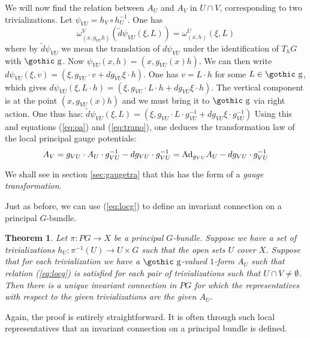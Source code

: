 \documentclass[12pt,titlepage]{article}
\def\goth#1{\hbox{\gothic #1}}
\def\gg{{\goth g}}
\def\Ad{\hbox{Ad}}
\newtheorem{theorem}{Theorem}
\begin{document}
We will now find the relation between \(A _U\) and
\(A _V\) in \(U \cap V\), corresponding to two trivializations.
Let \(\psi_{VU} = h_V\circ h_U^{-1}\). One has
\begin{equation}\label{eq:trano}
\omega^V_{(x,g_{VU}h)}(\tilde d\psi_{VU}(\xi,L)) =
\omega^U_{(x,h)}(\xi,L)
\end{equation}%
where  by \(\tilde d\psi_{VU}\) we mean the
translation of  \(d\psi_{VU}\)
under the
identification of \(T_hG\) with \(\gg\).
Now \(\psi_{VU}(x,h) = (x, g_{VU}(x)h)\).
We can then write
\(d\psi_{VU}(\xi,v) = (\xi, g_{VU}\cdot  v +
dg_{VU}\xi \cdot h) \). One has
\(v=L\cdot h\) for some \(L\in\gg\), which  gives \(d\psi_{VU} (
\xi, L\cdot h) = (\xi, g_{VU}\cdot L\cdot h
+ dg_{VU}\xi \cdot h)\). The vertical component is at  the point
\((x,g_{VU}(x)h)\)
and we must bring it to \(\gg\) via right
action. One thus has: \(\tilde d\psi_{VU} (\xi, L) = (\xi,
g_{VU}\cdot L\cdot g_{VU}^{-1}
+ dg_{VU}\xi \cdot g_{VU}^{-1})\)
Using this and equations (\ref{eq:oa}) and (\ref{eq:trano}), one deduces
the
transformation law of the local principal gauge potentials:
\begin{equation}\label{eq:locg}
A _V =
g_{VU}\cdot A _U\cdot g_{VU}^{-1} -
dg_{VU}\cdot g_{VU}^{-1} = \Ad_{g_{VU}}A _U -
dg_{VU}\cdot g_{VU}^{-1}
\end{equation}%

We shall see in section \ref{sec:gaugetra} that this has the form of a {\em
gauge
transformation}.
%

Just as before, we can use (\ref{eq:locg}) to define an invariant
connection on a principal \(G\)-bundle.

\begin{theorem}\label{th:gluea}
Let \(\pi:PG\to X\) be a principal \(G\)-bundle. Suppose
we have a set of  trivializations \(h_U:\pi^{-1}(U)\to U\times G\) 
such that the open sets \(U\) cover \(X\).  Suppose that for each
trivialization we have a \(\gg\)-valued \(1\)-form 
\(A_U\) such
that relation (\ref{eq:locg}) is satisfied for each pair of
trivializations such that \(U\cap V\neq\emptyset\). Then there is a
unique invariant connection in \(PG\) for which the  representatives with
respect to the given trivializations are the given \(A_U\).
\end{theorem}%
Again, the proof is entirely straightforward. It is often through such
local representatives that an invariant connection on a principal
bundle is defined.
\end{document}
